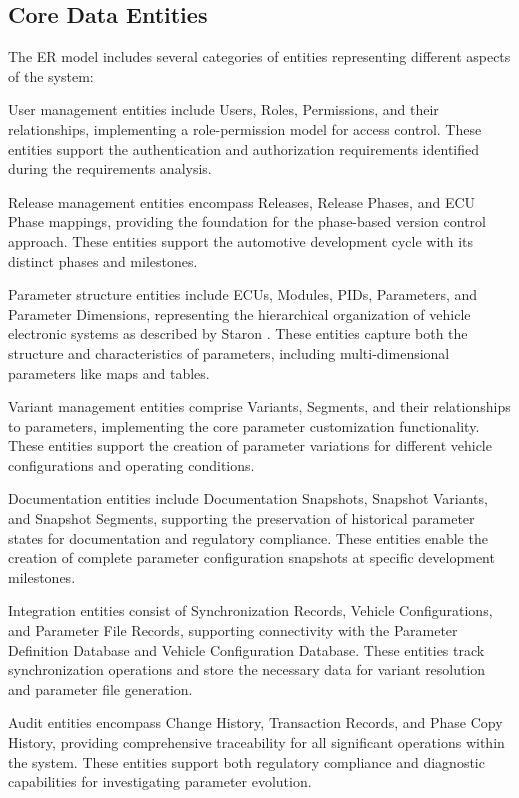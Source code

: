 \subsection{Core Data Entities}
\label{subsec:core-data-entities}

The ER model includes several categories of entities representing different aspects of the system:

User management entities include Users, Roles, Permissions, and their relationships, implementing a role-permission model for access control. These entities support the authentication and authorization requirements identified during the requirements analysis.

Release management entities encompass Releases, Release Phases, and \ac{ECU} Phase mappings, providing the foundation for the phase-based version control approach. These entities support the automotive development cycle with its distinct phases and milestones.

Parameter structure entities include \acp{ECU}, Modules, PIDs, Parameters, and Parameter Dimensions, representing the hierarchical organization of vehicle electronic systems as described by Staron \cite{staron2021automotive}. These entities capture both the structure and characteristics of parameters, including multi-dimensional parameters like maps and tables.

Variant management entities comprise Variants, Segments, and their relationships to parameters, implementing the core parameter customization functionality. These entities support the creation of parameter variations for different vehicle configurations and operating conditions.

Documentation entities include Documentation Snapshots, Snapshot Variants, and Snapshot Segments, supporting the preservation of historical parameter states for documentation and regulatory compliance. These entities enable the creation of complete parameter configuration snapshots at specific development milestones.

Integration entities consist of Synchronization Records, Vehicle Configurations, and Parameter File Records, supporting connectivity with the Parameter Definition Database and Vehicle Configuration Database. These entities track synchronization operations and store the necessary data for variant resolution and parameter file generation.

Audit entities encompass Change History, Transaction Records, and Phase Copy History, providing comprehensive traceability for all significant operations within the system. These entities support both regulatory compliance and diagnostic capabilities for investigating parameter evolution.

